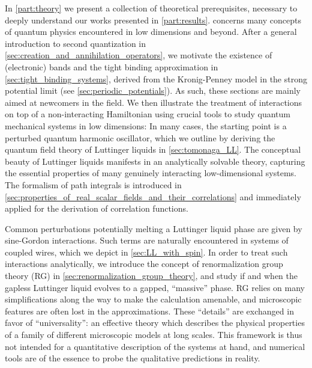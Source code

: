 In \cref{part:theory} we present a collection of theoretical prerequisites, necessary to deeply understand our works presented in \cref{part:results}.
 concerns many concepts of quantum physics encountered in low dimensions and beyond.
After a general introduction to second quantization in \cref{sec:creation_and_annihilation_operators}, we motivate the existence of (electronic) bands and the tight binding approximation in \cref{sec:tight_binding_systems}, derived from the Kronig-Penney model in the strong potential limit (see \cref{sec:periodic_potentials}).
As such, these sections are mainly aimed at newcomers in the field.
We then illustrate the treatment of interactions on top of a non-interacting Hamiltonian using crucial tools to study quantum mechanical systems in low dimensions: In many cases, the starting point is a perturbed quantum harmonic oscillator, which we outline by deriving the quantum field theory of Luttinger liquids in \cref{sec:tomonaga_LL}.
The conceptual beauty of Luttinger liquids manifests in an analytically solvable theory, capturing the essential properties of many genuinely interacting low-dimensional systems.
The formalism of path integrals is introduced in \cref{sec:properties_of_real_scalar_fields_and_their_correlations} and immediately applied for the derivation of correlation functions.

Common perturbations potentially melting a Luttinger liquid phase are given by sine-Gordon interactions.
Such terms are naturally encountered in systems of coupled wires, which we depict in \cref{sec:LL_with_spin}.
In order to treat such interactions analytically, we introduce the concept of renormalization group theory (RG) in \cref{sec:renormalization_group_theory}, and study if and when the gapless Luttinger liquid evolves to a gapped, ``massive'' phase.
RG relies on many simplifications along the way to make the calculation amenable, and microscopic features are often lost in the approximations.
These ``details'' are exchanged in favor of ``universality'': an effective theory which describes the physical properties of a family of different microscopic models at long scales.
This framework is thus not intended for a quantitative description of the systems at hand, and numerical tools are of the essence to probe the qualitative predictions in reality.

